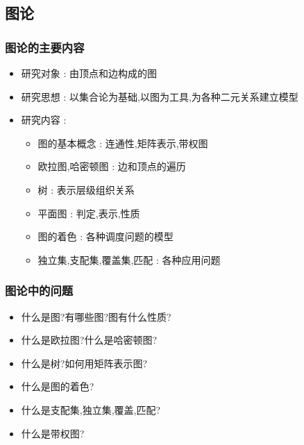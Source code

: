 {{}%

\subsection{图论}{

  \subsubsection{图论的主要内容}{
    \begin{itemize}
      \item 研究对象 : 由顶点和边构成的图
      \item 研究思想 : 以集合论为基础,以图为工具,为各种二元关系建立模型
      \item 研究内容 : \begin{itemize}
              \item 图的基本概念 : 连通性,矩阵表示,带权图
              \item 欧拉图,哈密顿图 : 边和顶点的遍历
              \item 树 : 表示层级组织关系
              \item 平面图 : 判定,表示,性质
              \item 图的着色 : 各种调度问题的模型
              \item 独立集,支配集,覆盖集,匹配 : 各种应用问题
            \end{itemize}
    \end{itemize}
  }%

  \subsubsection{图论中的问题}{
    \begin{itemize}
      \item 什么是图?有哪些图?图有什么性质?
      \item 什么是欧拉图?什么是哈密顿图?
      \item 什么是树?如何用矩阵表示图?
      \item 什么是图的着色?
      \item 什么是支配集,独立集,覆盖,匹配?
      \item 什么是带权图?
    \end{itemize}
  }%

}%

}%
